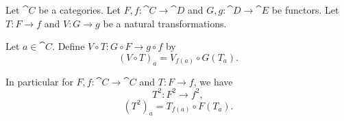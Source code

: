 \begin{definition}
Let $\cat{C}$ be a categories.
Let $F,f:\cat{C} \rightarrow \cat{D}$
and $G,g: \cat{D} \rightarrow \cat{E}$ be functors.
Let $T: F \rightarrow f$
and $V: G \rightarrow g$ be a natural transformations.

Let $a \in \cat{C}$.
Define $V\circ T: G\circ F \rightarrow g \circ f$ by
\[(V \circ T)_a = V_{f(a)}\circ G(T_a).\]

In particular for $F,f: \cat{C} \rightarrow \cat{C}$
and $T:F\rightarrow f$, we have
\[T^2: F^2 \rightarrow f^2,\]
\[(T^2)_a = T_{f(a)} \circ F(T_a).\]
\end{definition}